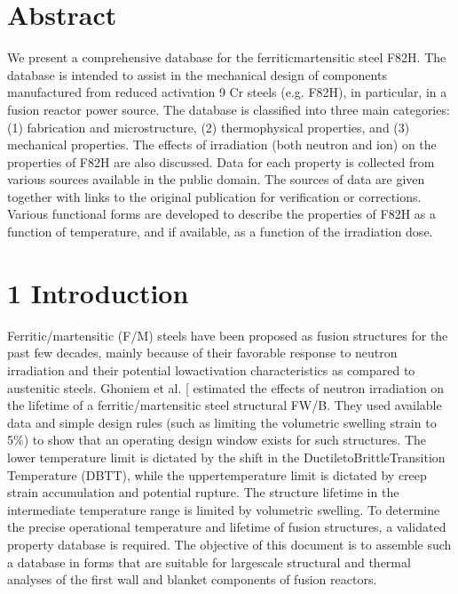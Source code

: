 \documentclass[letterpaper,10pt,english]{jupyterBook}
\begin{document}
	\chapter{Abstract}
	\label{\detokenize{0 Abstract:abstract}}\label{\detokenize{0 Abstract::doc}}
	\sphinxAtStartPar
	We present a comprehensive database for the ferritic\sphinxhyphen{}martensitic steel F82H.  The database is intended to assist in the mechanical design of components manufactured from reduced activation 9 Cr steels (e.g. F82H), in particular, in a fusion reactor power source. The database is classified into three main categories: (1) fabrication and microstructure, (2) thermophysical properties, and (3) mechanical properties.  The effects of irradiation (both neutron and ion) on the properties of F82H are also discussed. Data for each property is collected from various sources available in the public domain.  The sources of data are given together with links to the original publication for verification or corrections. Various functional forms are developed to describe the properties of F82H as a function of temperature, and if available, as a function of the irradiation dose.
	
	\sphinxstepscope
	
	
	\chapter{1 Introduction}
	\label{\detokenize{1 Introduction:introduction}}\label{\detokenize{1 Introduction::doc}}
	\sphinxAtStartPar
	Ferritic/martensitic (F/M) steels have been proposed as fusion structures for the past few decades, mainly because of their favorable response to neutron irradiation and their potential low\sphinxhyphen{}activation characteristics as compared to austenitic steels. Ghoniem et al. {[}\sphinxhref{https://drive.google.com/file/d/1ew3R7uERw\_tVeU7rHq3nv49yipBu4MGc/view?usp=drive\_link}{Ghoniem1983}{]} estimated the effects of neutron irradiation on the lifetime of a ferritic/martensitic steel structural FW/B.  They used available data and simple design rules (such as limiting the volumetric swelling strain to 5\%) to show that an operating design window exists for such structures.  The lower temperature limit is dictated by the shift in the Ductile\sphinxhyphen{}to\sphinxhyphen{}Brittle\sphinxhyphen{}Transition Temperature (DBTT), while the upper\sphinxhyphen{}temperature limit is dictated by creep strain accumulation and potential rupture.  The structure lifetime in the intermediate temperature range is limited by volumetric swelling. To determine the precise operational temperature and lifetime of fusion structures, a validated property database is required.  The objective of this document is to assemble such a database in forms that are suitable for large\sphinxhyphen{}scale structural and thermal analyses of the first wall and blanket components of fusion reactors.
	
\end{document}
